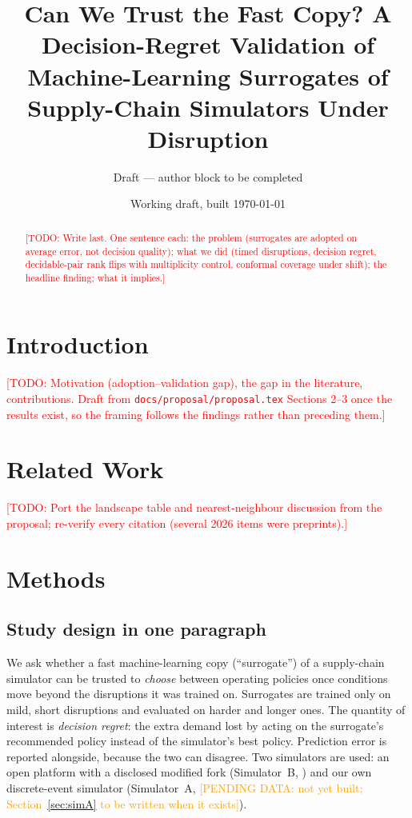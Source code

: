 \documentclass[11pt,a4paper]{article}
\title{Can We Trust the Fast Copy? A Decision-Regret Validation of Machine-Learning Surrogates of Supply-Chain Simulators Under Disruption}
\author{Draft --- author block to be completed}
\date{Working draft, built \today}
\newcommand{\todo}[1]{\textcolor{red}{[TODO: #1]}}
\newcommand{\pending}[1]{\textcolor{orange}{[PENDING DATA: #1]}}
\begin{document}
\maketitle

\begin{abstract}
\todo{Write last. One sentence each: the problem (surrogates are adopted on average error, not decision quality); what we did (timed disruptions, decision regret, decidable-pair rank flips with multiplicity control, conformal coverage under shift); the headline finding; what it implies.}
\end{abstract}

\section{Introduction}
\todo{Motivation (adoption--validation gap), the gap in the literature, contributions. Draft from \texttt{docs/proposal/proposal.tex} Sections 2--3 once the results exist, so the framing follows the findings rather than preceding them.}

\section{Related Work}
\todo{Port the landscape table and nearest-neighbour discussion from the proposal; re-verify every citation (several 2026 items were preprints).}

\section{Methods}\label{sec:methods}

\subsection{Study design in one paragraph}
We ask whether a fast machine-learning copy (``surrogate'') of a supply-chain simulator can be trusted to \emph{choose} between operating policies once conditions move beyond the disruptions it was trained on. Surrogates are trained only on mild, short disruptions and evaluated on harder and longer ones. The quantity of interest is \emph{decision regret}: the extra demand lost by acting on the surrogate's recommended policy instead of the simulator's best policy. Prediction error is reported alongside, because the two can disagree. Two simulators are used: an open platform with a disclosed modified fork (Simulator~B, \citealp{zhang2026isomorph}) and our own discrete-event simulator (Simulator~A, \pending{not yet built; Section~\ref{sec:simA} to be written when it exists}).
\end{document}
